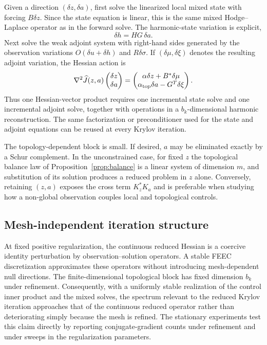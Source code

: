 \documentclass{article}
\begin{document}
Given a direction $(\delta z,\delta a)$, first solve the linearized local mixed state with forcing $B\delta z$.  Since the state equation is linear, this is the same mixed Hodge--Laplace operator as in the forward solve.  The harmonic-state variation is explicit,
\[
  \delta h=HG\,\delta a.
\]
Next solve the weak adjoint system with right-hand sides generated by the observation variations $O(\delta u+\delta h)$ and $R\delta\sigma$.  If $(\delta\mu,\delta\xi)$ denotes the resulting adjoint variation, the Hessian action is
\[
  \nabla^2\widehat J(z,a)
  \begin{pmatrix}\delta z\\ \delta a\end{pmatrix}
  =
  \begin{pmatrix}
    \alpha\delta z+B^*\delta\mu\\
    \alpha_{\rm top}\delta a-G^T\delta\xi
  \end{pmatrix}.
\]
Thus one Hessian-vector product requires one incremental state solve and one incremental adjoint solve, together with operations in a $b_k$-dimensional harmonic reconstruction.  The same factorization or preconditioner used for the state and adjoint equations can be reused at every Krylov iteration.

The topology-dependent block is small.  If desired, $a$ may be eliminated exactly by a Schur complement.  In the unconstrained case, for fixed $z$ the topological balance law of Proposition~\ref{prop:balance} is a linear system of dimension $m$, and substitution of its solution produces a reduced problem in $z$ alone.  Conversely, retaining $(z,a)$ exposes the cross term $K_z^*K_a$ and is preferable when studying how a non-global observation couples local and topological controls.

\subsection{Mesh-independent iteration structure}
\label{sec:mesh-independent-methods}

At fixed positive regularization, the continuous reduced Hessian is a coercive identity perturbation by observation--solution operators.  A stable FEEC discretization approximates these operators without introducing mesh-dependent null directions.  The finite-dimensional topological block has fixed dimension $b_k$ under refinement.  Consequently, with a uniformly stable realization of the control inner product and the mixed solves, the spectrum relevant to the reduced Krylov iteration approaches that of the continuous reduced operator rather than deteriorating simply because the mesh is refined.  The stationary experiments test this claim directly by reporting conjugate-gradient counts under refinement and under sweeps in the regularization parameters.
\end{document}
